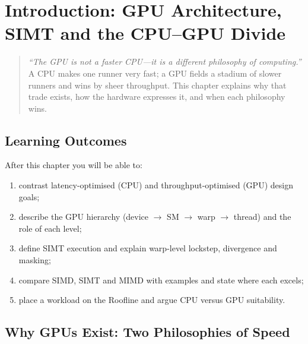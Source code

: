 \chapter{Introduction: GPU Architecture, SIMT and the CPU--GPU Divide}
\label{ch:intro-gpu}
\sloppy

\begin{quote}
\emph{``The GPU is not a faster CPU---it is a different philosophy of computing.''} A CPU makes one runner very fast; a GPU fields a stadium of slower runners and wins by sheer throughput. This chapter explains why that trade exists, how the hardware expresses it, and when each philosophy wins.
\end{quote}

\noindent{}
\vspace{0.4em}

\section*{Learning Outcomes}
After this chapter you will be able to:
\begin{enumerate}[label=(L\arabic*)]
    \item contrast latency-optimised (CPU) and throughput-optimised (GPU) design goals;
    \item describe the GPU hierarchy (device $\to$ SM $\to$ warp $\to$ thread) and the role of each level;
    \item define SIMT execution and explain warp-level lockstep, divergence and masking;
    \item compare SIMD, SIMT and MIMD with examples and state where each excels;
    \item place a workload on the Roofline and argue CPU versus GPU suitability.
\end{enumerate}

\section{Why GPUs Exist: Two Philosophies of Speed}
\label{sec:why-gpu}
